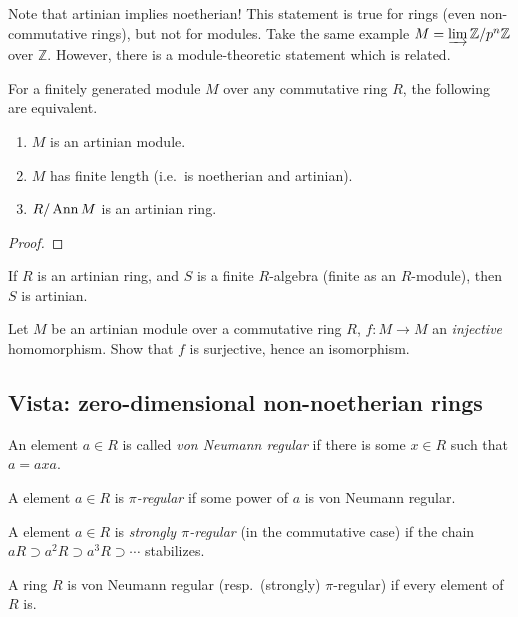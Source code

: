  \begin{remark}
 Note that artinian implies noetherian! This statement is true for rings (even
 non-commutative rings), but not for modules. Take the same example $M = \varinjlim
   \mathbb{Z}/p^n\mathbb{Z}$ over $\mathbb{Z}$. However, there is a module-theoretic statement which is
   related.
 \end{remark}
 \begin{corollary}
   For a finitely generated module $M$ over any commutative ring $R$, the following are
   equivalent.
   \begin{enumerate}
     \item $M$ is an artinian module.
     \item $M$ has finite length (i.e.\ is noetherian and artinian).
     \item $R/\operatorname{Ann} M$ is an artinian ring.
   \end{enumerate}
 \end{corollary}
\begin{proof} 
\end{proof} 
\begin{exercise} 
If $R$ is an artinian ring, and $S$ is a finite $R$-algebra (finite as an
$R$-module), then $S$ is artinian.
\end{exercise} 

\begin{exercise} 
Let $M$ be an artinian module over a commutative ring $R$, $f: M \to M$ an \emph{injective} homomorphism.
Show that $f$ is surjective, hence an isomorphism. 
\end{exercise} 


\subsection{Vista: zero-dimensional non-noetherian rings}
 \begin{definition}
   An element $a\in R$ is called \emph{von Neumann regular} if there is some $x\in R$
   such that $a=axa$.
 \end{definition}
 \begin{definition}[McCoy]
   A element $a\in R$ is \emph{$\pi$-regular} if some power of $a$ is von Neumann
   regular.
 \end{definition}
 \begin{definition}
   A element $a\in R$ is \emph{strongly $\pi$-regular} (in the commutative case)
   if the chain $aR\supset a^2R\supset a^3R\supset \cdots$ stabilizes.
 \end{definition}
 A ring $R$ is von Neumann regular (resp.\ (strongly) $\pi$-regular) if every element of
 $R$ is.

